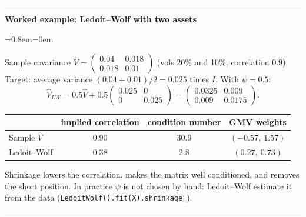 \documentclass[11pt,a4paper]{report}
\newenvironment{notebox}[1]
  {\par\medskip\Needspace{6\baselineskip}\noindent\rule{\linewidth}{0.4pt}\par\nopagebreak
   \noindent\textbf{#1}\par\nopagebreak
   \begin{list}{}{\leftmargin=0.8em\rightmargin=0em\topsep=2pt}\item[]}
  {\end{list}\nopagebreak\noindent\rule{\linewidth}{0.4pt}\par\medskip}
\newenvironment{workedex}[1][]{\begin{notebox}{Worked example#1}}{\end{notebox}}
\begin{document}
\begin{workedex}[: Ledoit--Wolf with two assets]
Sample covariance $\hat V=\begin{pmatrix}0.04&0.018\\0.018&0.01\end{pmatrix}$
(vols 20\% and 10\%, correlation 0.9). Target: average variance
$(0.04+0.01)/2=0.025$ times $I$. With $\psi=0.5$:
\[
\hat V_{LW}=0.5\hat V+0.5\begin{pmatrix}0.025&0\\0&0.025\end{pmatrix}
=\begin{pmatrix}0.0325&0.009\\0.009&0.0175\end{pmatrix}.
\]
\begin{center}
\begin{tabular}{@{}lccc@{}}
\toprule
 & implied correlation & condition number & GMV weights \\
\midrule
Sample $\hat V$ & 0.90 & 30.9 & $(-0.57,\ 1.57)$ \\
Ledoit--Wolf & 0.38 & 2.8 & $(0.27,\ 0.73)$ \\
\bottomrule
\end{tabular}
\end{center}
Shrinkage lowers the correlation, makes the matrix well conditioned, and removes
the short position. In practice $\psi$ is not chosen by hand: Ledoit--Wolf estimate
it from the data (\texttt{LedoitWolf().fit(X).shrinkage\_}).
\end{workedex}
\end{document}
